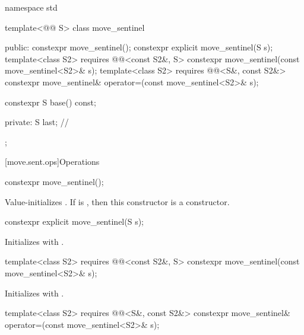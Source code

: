 %
\begin{codeblock}
namespace std {
  template<@@ S>
  class move_sentinel {
  public:
    constexpr move_sentinel();
    constexpr explicit move_sentinel(S s);
    template<class S2>
      requires @@<const S2&, S>
        constexpr move_sentinel(const move_sentinel<S2>& s);
    template<class S2>
      requires @@<S&, const S2&>
        constexpr move_sentinel& operator=(const move_sentinel<S2>& s);

    constexpr S base() const;

  private:
    S last;     // \expos
  };
}
\end{codeblock}

[move.sent.ops]{Operations}

%
\begin{itemdecl}
constexpr move_sentinel();
\end{itemdecl}

\begin{itemdescr}
\pnum
\effects
Value-initializes .
If  is ,
then this constructor is a  constructor.
\end{itemdescr}

%
\begin{itemdecl}
constexpr explicit move_sentinel(S s);
\end{itemdecl}

\begin{itemdescr}
\pnum
\effects
Initializes  with .
\end{itemdescr}

%
\begin{itemdecl}
template<class S2>
  requires @@<const S2&, S>
    constexpr move_sentinel(const move_sentinel<S2>& s);
\end{itemdecl}

\begin{itemdescr}
\pnum
\effects
Initializes  with .
\end{itemdescr}

%
%
\begin{itemdecl}
template<class S2>
  requires @@<S&, const S2&>
    constexpr move_sentinel& operator=(const move_sentinel<S2>& s);
\end{itemdecl}


